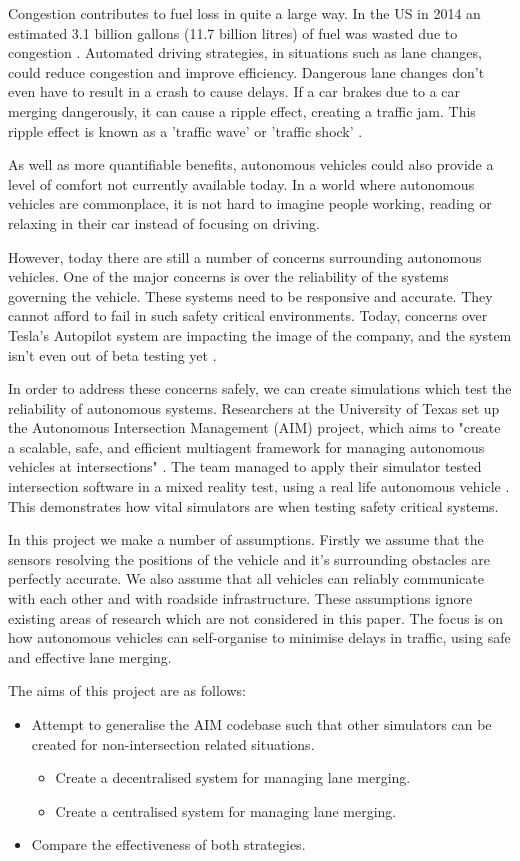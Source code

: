 Congestion contributes to fuel loss in quite a large way. In the US in 2014 an estimated 3.1 billion gallons (11.7 billion litres) of fuel was wasted due to congestion \citep{Schrank2015}. Automated driving strategies, in situations such as lane changes, could reduce congestion and improve efficiency. Dangerous lane changes don't even have to result in a crash to cause delays. If a car brakes due to a car merging dangerously, it can cause a ripple effect, creating a traffic jam. This ripple effect is known as a 'traffic wave' or 'traffic shock' \citep{Daganzo1994}.

As well as more quantifiable benefits, autonomous vehicles could also provide a level of comfort not currently available today. In a world where autonomous vehicles are commonplace, it is not hard to imagine people working, reading or relaxing in their car instead of focusing on driving. 

However, today there are still a number of concerns surrounding autonomous vehicles. One of the major concerns is over the reliability of the systems governing the vehicle. These systems need to be responsive and accurate. They cannot afford to fail in such safety critical environments. Today, concerns over Tesla's Autopilot system are impacting the image of the company, and the system isn't even out of beta testing yet \citep{TeslaCriticised}. 

In order to address these concerns safely, we can create simulations which test the reliability of autonomous systems. Researchers at the University of Texas set up the Autonomous Intersection Management (AIM) project, which aims to "create a scalable, safe, and efficient multiagent framework for managing autonomous vehicles at intersections" \citep{AIMProject}. The team managed to apply their simulator tested intersection software in a mixed reality test, using a real life autonomous vehicle \citep{Quinlan2010}. This demonstrates how vital simulators are when testing safety critical systems.

In this project we make a number of assumptions. Firstly we assume that the sensors resolving the positions of the vehicle and it's surrounding obstacles are perfectly accurate. We also assume that all vehicles can reliably communicate with each other and with roadside infrastructure. These assumptions ignore existing areas of research which are not considered in this paper. The focus is on how autonomous vehicles can self-organise to minimise delays in traffic, using safe and effective lane merging.

The aims of this project are as follows:
\begin{itemize}
\item Attempt to generalise the AIM codebase such that other simulators can be created for non-intersection related situations.
\begin{itemize}
\item Create a decentralised system for managing lane merging.
\item Create a centralised system for managing lane merging.
\end{itemize}
\item Compare the effectiveness of both strategies.
\end{itemize}